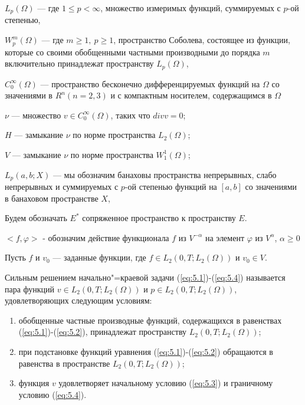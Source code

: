 $L_p(\Omega)$ --- где $1\leqslant p<\infty$, множество измеримых функций, суммируемых с $p$-ой степенью,

$W_p^m(\Omega)$ --- где $m\geqslant 1, \ p\geqslant 1$, пространство Соболева, состоящее из
функции, которые со своими обобщенными частными производными до порядка $m$ включительно принадлежат пространству $L_p(\Omega)$,

$C_0^{\infty}(\Omega)$ --- пространство бесконечно дифференцируемых функций на $\Omega$ со значениями в $R^n(n=2, 3)$ и с компактным носителем,
содержащимся в $\Omega$

$\nu$ --- множество $v\in C_0^{\infty}(\Omega)$, таких что $div v=0$;

$H$ --- замыкание $\nu$ по норме пространства $L_2(\Omega)$;

$V$ --- замыкание $\nu$ по норме пространства $W_1^1(\Omega)$;

$L_p(a, b;X)$ --- мы обозначим банаховы пространства непрерывных, слабо непрерывных и суммируемых с $p$-ой степенью функций на $[a, b]$ со значениями в
банаховом пространстве $X$,

Будем обозначать $E^*$ сопряженное пространство к пространству  $E$.

$<f,\varphi>$ - обозначим действие функционала $f$ из $V^{-\alpha}$ на элемент $\varphi$ из $V^{\alpha}$, $\alpha\geqslant 0$

Пусть $f$ и $v_0$ --- заданные функции,
где $f\in L_2(0, T; L_2(\Omega))$ и $v_0\in V$.

\begin{definition}
    Сильным решением начально"=краевой задачи (\ref{eq:5.1})-(\ref{eq:5.4}) называется пара функций $v\in L_2(0, T; L_2(\Omega))$ и
    $p\in L_2(0, T; L_2(\Omega))$, удовлетворяющих следующим условиям:
\end{definition}

\begin{enumerate} 
    \item обобщенные частные производные функций, содержащихся в равенствах (\ref{eq:5.1})-(\ref{eq:5.2}), принадлежат пространству $L_2(0, T; L_2(\Omega))$;
    \item при подстановке функций уравнения (\ref{eq:5.1})-(\ref{eq:5.2}) обращаются в равенства в пространстве $L_2(0, T; L_2(\Omega))$;
    \item функция $v$ удовлетворяет начальному условию (\ref{eq:5.3}) и граничному условию (\ref{eq:5.4}).
\end{enumerate}

